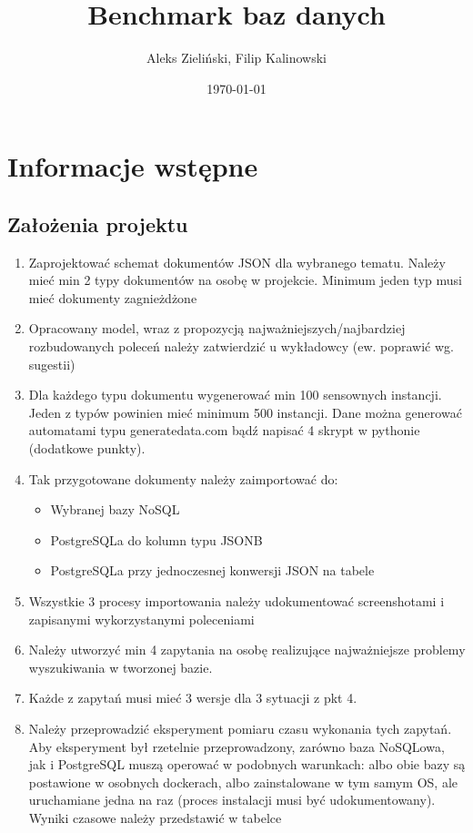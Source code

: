 \documentclass[11pt]{article}
\title{\textbf{Benchmark baz danych}}
\author{Aleks Zieliński, Filip Kalinowski}
\date{\today}
\begin{document}
\maketitle

\newpage
\begingroup
\tableofcontents
\endgroup

\newpage
\section{Informacje wstępne}
	\subsection{Założenia projektu}
		\begin{enumerate}
			\item Zaprojektować schemat dokumentów JSON dla wybranego tematu. Należy mieć min 2 typy dokumentów na osobę w projekcie. Minimum jeden typ musi mieć dokumenty zagnieżdżone
			\item  Opracowany model, wraz z propozycją najważniejszych/najbardziej rozbudowanych poleceń należy zatwierdzić u wykładowcy (ew. poprawić wg. sugestii)
			\item Dla każdego typu dokumentu wygenerować min 100 sensownych instancji. Jeden z typów powinien mieć minimum 500 instancji. Dane można generować automatami typu generatedata.com bądź napisać 4 skrypt w pythonie (dodatkowe punkty).
			\item  Tak przygotowane dokumenty należy zaimportować do:
			\begin{itemize}
				\item Wybranej bazy NoSQL
				\item PostgreSQLa do kolumn typu JSONB
				\item PostgreSQLa przy jednoczesnej konwersji JSON na tabele
			\end{itemize}
			\item Wszystkie 3 procesy importowania należy udokumentować screenshotami i zapisanymi wykorzystanymi poleceniami
			\item  Należy utworzyć min 4 zapytania na osobę realizujące najważniejsze problemy wyszukiwania w tworzonej bazie. 
			\item Każde z zapytań musi mieć 3 wersje dla 3 sytuacji z pkt 4. 
			\item Należy przeprowadzić eksperyment pomiaru czasu wykonania tych zapytań. Aby eksperyment był rzetelnie przeprowadzony, zarówno baza NoSQLowa, jak i PostgreSQL muszą operować w podobnych warunkach: albo obie bazy są postawione w osobnych dockerach, albo zainstalowane w tym samym OS, ale uruchamiane jedna na raz (proces instalacji musi być udokumentowany). Wyniki czasowe należy przedstawić w tabelce
		\end{enumerate}
\end{document}
